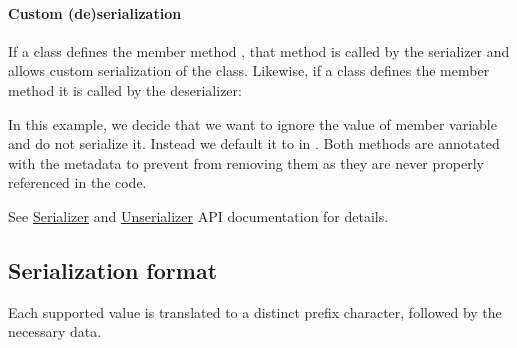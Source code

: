 \paragraph{Custom (de)serialization}

If a class defines the member method , that method is called by the serializer and allows custom serialization of the class. Likewise, if a class defines the member method  it is called by the deserializer:


In this example, we decide that we want to ignore the value of member variable  and do not serialize it. Instead we default it to  in . Both methods are annotated with the  metadata to prevent  from removing them as they are never properly referenced in the code.

See \href{https://api.haxe.org/haxe/Serializer.html}{Serializer} and \href{https://api.haxe.org/haxe/Unserializer.html}{Unserializer} API documentation for details.

\subsection{Serialization format}
\label{std-serialization-format}

Each supported value is translated to a distinct prefix character, followed by the necessary data.


